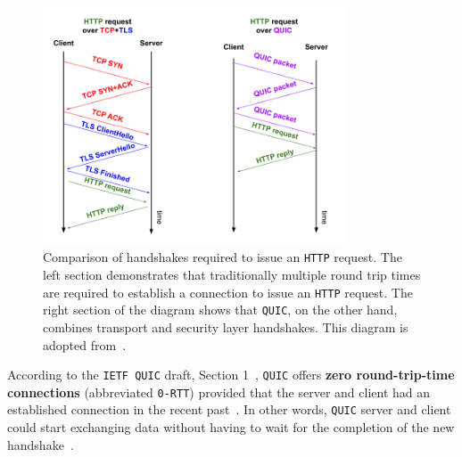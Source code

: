 \documentclass[12pt,a4paper]{report}
\newcommand\note[2]{{\color{#1}\bf #2}}
\newcommand\simon[1]{\ifcomments{\note{cyan}{SM: #1}}\fi}
\begin{document}
     \begin{figure}[htb]
    \centering
    \includegraphics[width=0.8\textwidth]{figs/QUIC_handshake_vs_TCP-TLS_handshake.png}
    \caption[Comparison of handshakes required to issue an \texttt{HTTP} request]{Comparison of handshakes required to issue an \texttt{HTTP} request. The left section demonstrates that traditionally multiple round trip times are required to establish a connection to issue an \texttt{HTTP} request. The right section of the diagram shows that \texttt{QUIC}, on the other hand, combines transport and security layer handshakes. This diagram is adopted from~\cite{the-road-to-quic}.}
    \label{fig:QUIC_handshake_vs_TCP-TLS_handshake}
    \end{figure}
 
 





    According to the \texttt{IETF QUIC} draft, Section 1~\cite{ietf-quic-transport-draft-32}, \texttt{QUIC} offers \textbf{zero round-trip-time connections} (abbreviated \texttt{0-RTT}) provided that the server and client had an established connection in the recent past~\cite{introducing-0-rtt}.
    In other words, \texttt{QUIC} server and client could start exchanging data without having to wait for the completion of the new handshake~\cite{ietf-quic-transport-draft-32}.
  
  
\end{document}
